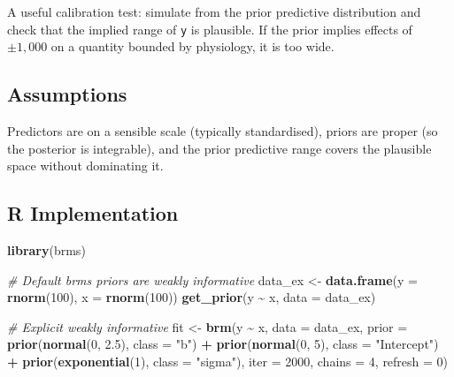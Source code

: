 \documentclass[
]{article}
\newenvironment{Shaded}{\begin{snugshade}}{\end{snugshade}}
\newcommand{\AttributeTok}[1]{\textcolor[rgb]{0.13,0.29,0.53}{#1}}
\newcommand{\CommentTok}[1]{\textcolor[rgb]{0.56,0.35,0.01}{\textit{#1}}}
\newcommand{\DecValTok}[1]{\textcolor[rgb]{0.00,0.00,0.81}{#1}}
\newcommand{\FloatTok}[1]{\textcolor[rgb]{0.00,0.00,0.81}{#1}}
\newcommand{\FunctionTok}[1]{\textcolor[rgb]{0.13,0.29,0.53}{\textbf{#1}}}
\newcommand{\NormalTok}[1]{#1}
\newcommand{\OtherTok}[1]{\textcolor[rgb]{0.56,0.35,0.01}{#1}}
\newcommand{\SpecialCharTok}[1]{\textcolor[rgb]{0.81,0.36,0.00}{\textbf{#1}}}
\newcommand{\StringTok}[1]{\textcolor[rgb]{0.31,0.60,0.02}{#1}}
\begin{document}
A useful calibration test: simulate from the prior predictive
distribution and check that the implied range of \texttt{y} is
plausible. If the prior implies effects of \(\pm 1{,}000\) on a quantity
bounded by physiology, it is too wide.

\subsection{Assumptions}\label{assumptions}

Predictors are on a sensible scale (typically standardised), priors are
proper (so the posterior is integrable), and the prior predictive range
covers the plausible space without dominating it.

\subsection{R Implementation}\label{r-implementation}

\begin{Shaded}
\begin{Highlighting}[]
\FunctionTok{library}\NormalTok{(brms)}

\CommentTok{\# Default brms priors are weakly informative}
\NormalTok{data\_ex }\OtherTok{\textless{}{-}} \FunctionTok{data.frame}\NormalTok{(}\AttributeTok{y =} \FunctionTok{rnorm}\NormalTok{(}\DecValTok{100}\NormalTok{), }\AttributeTok{x =} \FunctionTok{rnorm}\NormalTok{(}\DecValTok{100}\NormalTok{))}
\FunctionTok{get\_prior}\NormalTok{(y }\SpecialCharTok{\textasciitilde{}}\NormalTok{ x, }\AttributeTok{data =}\NormalTok{ data\_ex)}

\CommentTok{\# Explicit weakly informative}
\NormalTok{fit }\OtherTok{\textless{}{-}} \FunctionTok{brm}\NormalTok{(y }\SpecialCharTok{\textasciitilde{}}\NormalTok{ x, }\AttributeTok{data =}\NormalTok{ data\_ex,}
           \AttributeTok{prior =} \FunctionTok{prior}\NormalTok{(}\FunctionTok{normal}\NormalTok{(}\DecValTok{0}\NormalTok{, }\FloatTok{2.5}\NormalTok{), }\AttributeTok{class =} \StringTok{"b"}\NormalTok{) }\SpecialCharTok{+}
                   \FunctionTok{prior}\NormalTok{(}\FunctionTok{normal}\NormalTok{(}\DecValTok{0}\NormalTok{, }\DecValTok{5}\NormalTok{),   }\AttributeTok{class =} \StringTok{"Intercept"}\NormalTok{) }\SpecialCharTok{+}
                   \FunctionTok{prior}\NormalTok{(}\FunctionTok{exponential}\NormalTok{(}\DecValTok{1}\NormalTok{), }\AttributeTok{class =} \StringTok{"sigma"}\NormalTok{),}
           \AttributeTok{iter =} \DecValTok{2000}\NormalTok{, }\AttributeTok{chains =} \DecValTok{4}\NormalTok{, }\AttributeTok{refresh =} \DecValTok{0}\NormalTok{)}
\end{Highlighting}
\end{Shaded}
\end{document}
